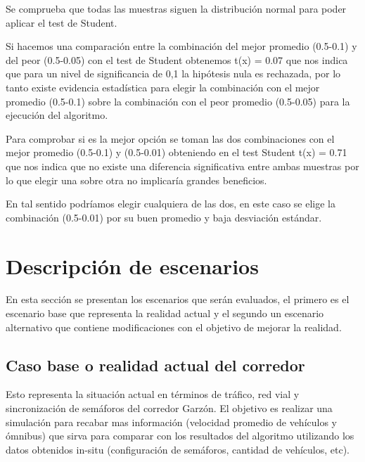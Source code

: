 Se comprueba que todas las muestras siguen la distribución normal para poder aplicar el test de Student. 

%
%

Si hacemos una comparación entre la combinación del mejor promedio (0.5-0.1) y del peor (0.5-0.05) con el test de Student obtenemos t(x) = 0.07 que nos indica que para un nivel de significancia de  0,1 la hipótesis nula es rechazada, por lo tanto existe evidencia estadística para elegir la combinación con el mejor promedio (0.5-0.1) sobre la combinación con el peor promedio (0.5-0.05) para la ejecución del algoritmo.

Para comprobar si es la mejor opción  se toman las dos combinaciones con el mejor promedio (0.5-0.1) y (0.5-0.01) obteniendo en el test Student t(x) = 0.71 que nos indica que no existe una diferencia significativa entre ambas muestras por lo que elegir una sobre otra no implicaría grandes beneficios.

En tal sentido podríamos elegir cualquiera de las dos, en este caso se elige  la combinación (0.5-0.01) por su buen promedio y baja desviación estándar.



\section{Descripción de escenarios}
En esta sección se presentan los escenarios que serán evaluados, el primero es el escenario base que representa la realidad actual y el segundo un escenario alternativo que contiene modificaciones con el objetivo de mejorar la realidad.

\subsection{Caso base o realidad actual del corredor}
Esto representa la situación actual en términos de tráfico, red vial y sincronización de semáforos del corredor Garzón. El objetivo es realizar una simulación para recabar mas información (velocidad promedio de vehículos y ómnibus) que sirva para comparar con los resultados del algoritmo utilizando los datos obtenidos in-situ (configuración de semáforos, cantidad de vehículos, etc). 


